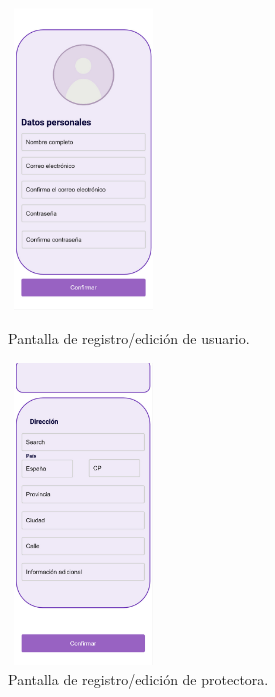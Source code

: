 \documentclass[a4paper, 12pt]{article}
\begin{document}
\begin{figure}[H]
   	\begin{minipage}{0.48\textwidth}
		\begin{center}
			{\includegraphics[height=8cm, width=4cm]{design/UserRegister.jpg}\par}
			\caption{Pantalla de registro/edición de usuario.}
			\medskip
		\end{center}  
	\end{minipage}\hfill
   	\begin{minipage}{0.48\textwidth}
		\begin{center}
			{\includegraphics[height=8cm, width=4cm]{design/CompanyRegister.jpg}\par}
			\caption{Pantalla de registro/edición de protectora.}
			\medskip
		\end{center}  
	\end{minipage}\hfill
\end{figure}
\end{document}
